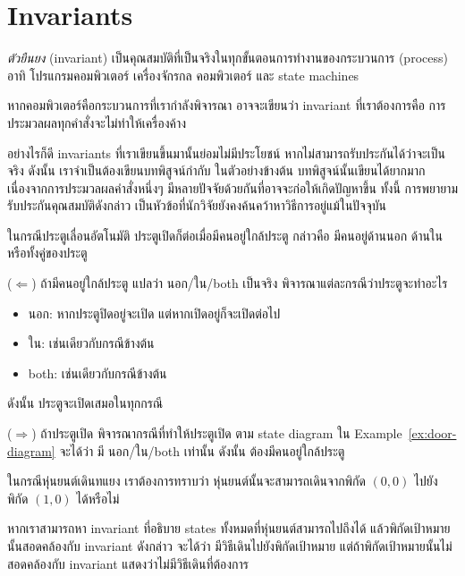 \section{Invariants}

\emph{ตัวยืนยง} (invariant) เป็นคุณสมบัติที่เป็นจริงในทุกขั้นตอนการทำงานของกระบวนการ (process) อาทิ โปรแกรมคอมพิวเตอร์ เครื่องจักรกล คอมพิวเตอร์ และ state machines

\begin{example}
หากคอมพิวเตอร์คือกระบวนการที่เรากำลังพิจารณา อาจจะเขียนว่า invariant ที่เราต้องการคือ การประมวลผลทุกคำสั่งจะไม่ทำให้เครื่องค้าง
\end{example}
อย่างไรก็ดี invariants ที่เราเขียนขึ้นมานั้นย่อมไม่มีประโยชน์ หากไม่สามารถรับประกันได้ว่าจะเป็นจริง ดังนั้น เราจำเป็นต้องเขียนบทพิสูจน์กำกับ \enskip ในตัวอย่างข้างต้น บทพิสูจน์นั้นเขียนได้ยากมาก เนื่องจากการประมวลผลคำสั่งหนึ่งๆ มีหลายปัจจัยด้วยกันที่อาจจะก่อให้เกิดปัญหาขึ้น ทั้งนี้ การพยายามรับประกันคุณสมบัติดังกล่าว เป็นหัวข้อที่นักวิจัยยังคงค้นคว้าหาวิธีการอยู่แม้ในปัจจุบัน

\begin{example}
ในกรณีประตูเลื่อนอัตโนมัติ ประตูเปิดก็ต่อเมื่อมีคนอยู่ใกล้ประตู กล่าวคือ มีคนอยู่ด้านนอก ด้านใน หรือทั้งคู่ของประตู
\begin{pf}
($\Leftarrow$) \quad ถ้ามีคนอยู่ใกล้ประตู แปลว่า นอก/ใน/both เป็นจริง พิจารณาแต่ละกรณีว่าประตูจะทำอะไร
\begin{itemize}
\item นอก: หากประตูปิดอยู่จะเปิด แต่หากเปิดอยู่ก็จะเปิดต่อไป
\item ใน: เช่นเดียวกับกรณีข้างต้น
\item both: เช่นเดียวกับกรณีข้างต้น
\end{itemize}
ดังนั้น ประตูจะเปิดเสมอในทุกกรณี

($\Rightarrow$) \quad ถ้าประตูเปิด พิจารณากรณีที่ทำให้ประตูเปิด ตาม state diagram ใน Example~\ref{ex:door-diagram} จะได้ว่า มี นอก/ใน/both เท่านั้น ดังนั้น ต้องมีคนอยู่ใกล้ประตู
\end{pf}
\end{example}

\begin{example}
ในกรณีหุ่นยนต์เดินทแยง เราต้องการทราบว่า หุ่นยนต์นั้นจะสามารถเดินจากพิกัด $(0,0)$ ไปยังพิกัด $(1,0)$ ได้หรือไม่

หากเราสามารถหา invariant ที่อธิบาย states ทั้งหมดที่หุ่นยนต์สามารถไปถึงได้ แล้วพิกัดเป้าหมายนั้นสอดคล้องกับ invariant ดังกล่าว จะได้ว่า มีวิธีเดินไปยังพิกัดเป้าหมาย แต่ถ้าพิกัดเป้าหมายนั้นไม่สอดคล้องกับ invariant แสดงว่าไม่มีวิธีเดินที่ต้องการ
\end{example}

